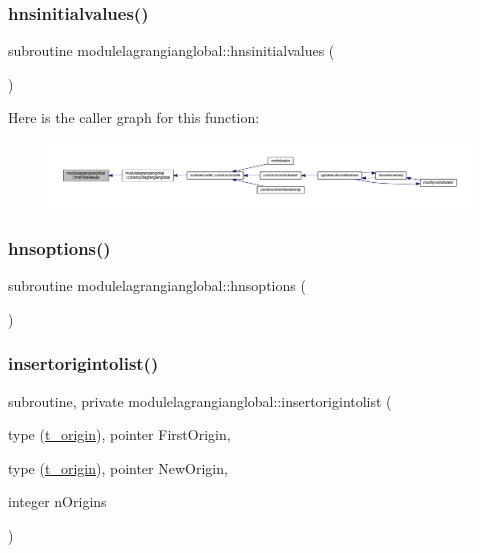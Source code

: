 \subsubsection{\texorpdfstring{hnsinitialvalues()}{hnsinitialvalues()}}
{\footnotesize\ttfamily subroutine modulelagrangianglobal\+::hnsinitialvalues (\begin{DoxyParamCaption}{ }\end{DoxyParamCaption})\hspace{0.3cm}{\ttfamily [private]}}

Here is the caller graph for this function\+:\nopagebreak
\begin{figure}[H]
\begin{center}
\leavevmode
\includegraphics[width=350pt]{namespacemodulelagrangianglobal_ad1111403d5d343cacd9cf3deb4c66ec9_icgraph}
\end{center}
\end{figure}
\mbox{\label{namespacemodulelagrangianglobal_a262f7ae29a62989ca338ab8fa6acca79}} 
\subsubsection{\texorpdfstring{hnsoptions()}{hnsoptions()}}
{\footnotesize\ttfamily subroutine modulelagrangianglobal\+::hnsoptions (\begin{DoxyParamCaption}{ }\end{DoxyParamCaption})\hspace{0.3cm}{\ttfamily [private]}}

\mbox{\label{namespacemodulelagrangianglobal_ab902fc69902a11b86ed8b0b64ece38d9}} 
\subsubsection{\texorpdfstring{insertorigintolist()}{insertorigintolist()}}
{\footnotesize\ttfamily subroutine, private modulelagrangianglobal\+::insertorigintolist (\begin{DoxyParamCaption}\item[{type (\mbox{\hyperlink{structmodulelagrangianglobal_1_1t__origin}{t\+\_\+origin}}), pointer}]{First\+Origin,  }\item[{type (\mbox{\hyperlink{structmodulelagrangianglobal_1_1t__origin}{t\+\_\+origin}}), pointer}]{New\+Origin,  }\item[{integer}]{n\+Origins }\end{DoxyParamCaption})\hspace{0.3cm}{\ttfamily [private]}}

